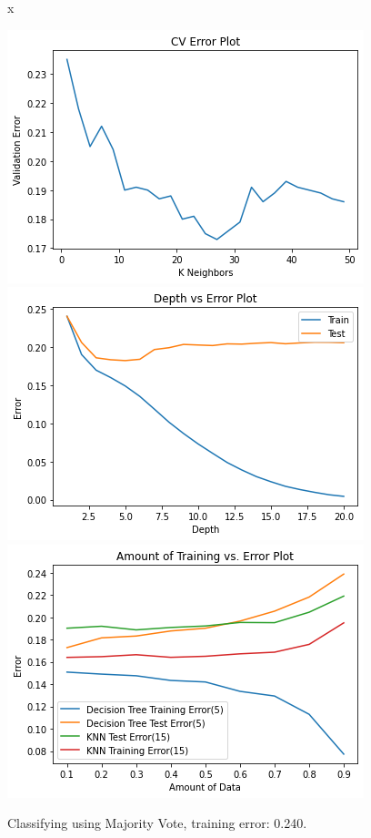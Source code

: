 \begin{enumerate}[resume]
\sol x

\begin{center}
    \includegraphics[scale=0.6]{5i-1.png} \\
    \includegraphics[scale=0.6]{5i-2.png} \\
    \includegraphics[scale=0.6]{5i-3.png} \\
\end{center}

Classifying using Majority Vote, training error: 0.240.


\end{enumerate}
